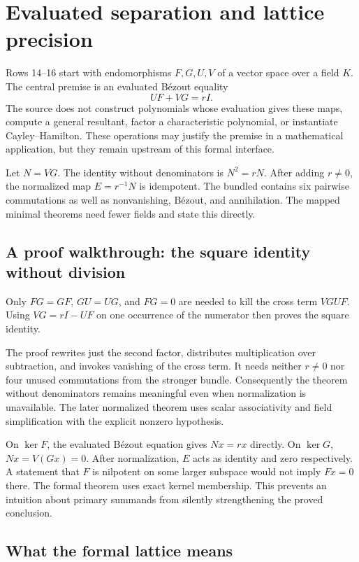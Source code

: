 \section{Evaluated separation and lattice precision}\label{sec:separation}

Rows 14--16 start with endomorphisms $F,G,U,V$ of a vector space over a field $K$. The central premise is an evaluated B\'ezout equality
\[
UF+VG=rI.
\]
The source does not construct polynomials whose evaluation gives these maps, compute a general resultant, factor a characteristic polynomial, or instantiate Cayley--Hamilton. These operations may justify the premise in a mathematical application, but they remain upstream of this formal interface.

Let $N=VG$. The identity without denominators is $N^2=rN$. After adding $r\ne0$, the normalized map $E=r^{-1}N$ is idempotent. The bundled  contains six pairwise commutations as well as nonvanishing, B\'ezout, and annihilation. The mapped minimal theorems need fewer fields and state this directly.

\subsection{A proof walkthrough: the square identity without division}

Only $FG=GF$, $GU=UG$, and $FG=0$ are needed to kill the cross term $VGUF$. Using $VG=rI-UF$ on one occurrence of the numerator then proves the square identity.

The proof rewrites just the second factor, distributes multiplication over subtraction, and invokes vanishing of the cross term. It needs neither $r\ne0$ nor four unused commutations from the stronger bundle. Consequently the theorem without denominators remains meaningful even when normalization is unavailable. The later normalized theorem uses scalar associativity and field simplification with the explicit nonzero hypothesis.

On $\ker F$, the evaluated B\'ezout equation gives $Nx=rx$ directly. On $\ker G$, $Nx=V(Gx)=0$. After normalization, $E$ acts as identity and zero respectively. A statement that $F$ is nilpotent on some larger subspace would not imply $Fx=0$ there. The formal theorem uses exact kernel membership. This prevents an intuition about primary summands from silently strengthening the proved conclusion.

\subsection{What the formal lattice means}

